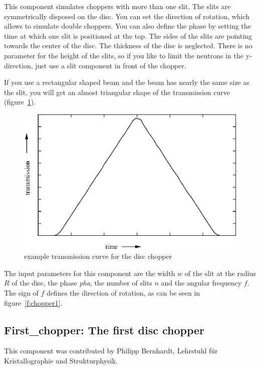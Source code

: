 This component simulates choppers with more than one slit. The slits are
symmetrically disposed on the disc. You can set the direction of
rotation, which allows to simulate double choppers. You can also define
the phase by setting the time at which one slit is positioned at the
top. The sides of the slits are pointing towards the center of the disc.
The thickness of the disc is neglected.  There is no parameter for the
height of the slits, so if you like to limit the neutrons in the
y-direction, just use a slit component in front of the chopper.

If you use a rectangular shaped beam and the beam has nearly the same
size as the slit, you will get an almost triangular shape of the
transmission curve (figure~\ref{f:chopper2}).

\begin{figure}[ht]
\includegraphics[width=1.0\linewidth]{figures/tracho.eps}
\caption{example transmission curve for the disc chopper\label{f:chopper2}}
\end{figure}    

The input parameters for this component are the width $w$ of the slit at
the radius $R$ of the disc, the phase \textit{pha}, the number of slits $n$ and the
angular frequency $f$. The sign of $f$ defines the direction of rotation, as
can be seen in figure~\ref{f:chopper1}.


\subsection{First\_chopper: The first disc chopper}
\label{s:first_chopper}

This component was contributed by Philipp Bernhardt, Lehrstuhl f\"ur
Kristallographie und Strukturphysik.

